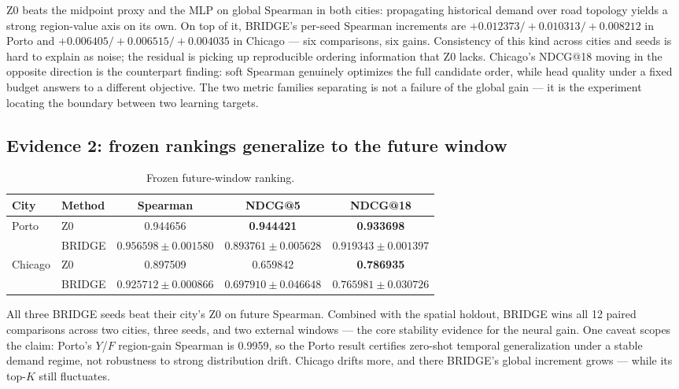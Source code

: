 \documentclass[5p,twocolumn,authoryear]{elsarticle}
\newenvironment{paperwidetable}{\begin{table}[t]}{\end{table}}
\newenvironment{paperwidetable}{\begin{table}[H]}{\end{table}}
\newcommand{\zmethod}{Z0}
\newcommand{\gmethod}{BRIDGE}
\begin{document}
\zmethod{} beats the midpoint proxy and the MLP on global Spearman in both cities:
propagating historical demand over road topology yields a strong region-value axis on its
own. On top of it, \gmethod's per-seed Spearman increments are
$+0.012373/+0.010313/+0.008212$ in Porto and $+0.006405/+0.006515/+0.004035$ in Chicago ---
six comparisons, six gains. Consistency of this kind across cities and seeds is hard to
explain as noise; the residual is picking up reproducible ordering information that
\zmethod{} lacks. Chicago's NDCG@18 moving in the opposite direction is the counterpart
finding: soft Spearman genuinely optimizes the full candidate order, while head quality
under a fixed budget answers to a different objective. The two metric families separating
is not a failure of the global gain --- it is the experiment locating the boundary between
two learning targets.

\subsection{Evidence 2: frozen rankings generalize to the future window}

\begin{paperwidetable}
  \centering
  \caption{Frozen future-window ranking.}
  \label{tab:future}
  \begin{tabular}{llccc}
    \toprule
    City & Method & Spearman & NDCG@5 & NDCG@18 \\
    \midrule
    Porto & \zmethod & 0.944656 & \textbf{0.944421} & \textbf{0.933698} \\
           & \gmethod & $\mathbf{0.956598\pm0.001580}$ & $0.893761\pm0.005628$ & $0.919343\pm0.001397$ \\
    \midrule
    Chicago & \zmethod & 0.897509 & 0.659842 & \textbf{0.786935} \\
            & \gmethod & $\mathbf{0.925712\pm0.000866}$ & $\mathbf{0.697910\pm0.046648}$ & $0.765981\pm0.030726$ \\
    \bottomrule
  \end{tabular}
\end{paperwidetable}

All three \gmethod{} seeds beat their city's \zmethod{} on future Spearman. Combined with
the spatial holdout, \gmethod{} wins all 12 paired comparisons across two cities, three
seeds, and two external windows --- the core stability evidence for the neural gain. One
caveat scopes the claim: Porto's $Y$/$F$ region-gain Spearman is 0.9959, so the Porto
result certifies zero-shot temporal generalization under a stable demand regime, not
robustness to strong distribution drift. Chicago drifts more, and there \gmethod's global
increment grows --- while its top-$K$ still fluctuates.
\end{document}
